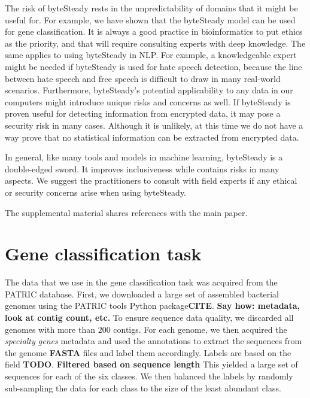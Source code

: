 \documentclass{article}
\begin{document}
The risk of byteSteady rests in the unpredictability of domains that it might be useful for. For example, we have shown that the byteSteady model can be used for gene classification. It is always a good practice in bioinformatics to put ethics as the priority, and that will require consulting experts with deep knowledge. The same applies to using byteSteady in NLP. For example, a knowledgeable expert might be needed if byteSteady is used for hate speech detection, because the line between hate speech and free speech is difficult to draw in many real-world scenarios. Furthermore, byteSteady's potential applicability to any data in our computers might introduce unique risks and concerns as well. If byteSteady is proven useful for detecting information from encrypted data, it may pose a security risk in many cases. Although it is unlikely, at this time we do not have a way prove that no statistical information can be extracted from encrypted data.

In general, like many tools and models in machine learning, byteSteady is a double-edged sword. It improves inclusiveness while contains risks in many aspects. We suggest the practitioners to consult with field experts if any ethical or security concerns arise when using byteSteady.






\vfill
\pagebreak
\appendix

The supplemental material shares references with the main paper.

\section{Gene classification task}

The data that we use in the gene classification task was acquired from the PATRIC database.
First, we downloaded a large set of assembled bacterial genomes using the PATRIC tools Python package\textbf{CITE}.
\textbf{Say how: metadata, look at contig count, etc.}
To ensure sequence data quality, we discarded all genomes with more than $200$ contigs.
For each genome, we then acquired the \emph{specialty genes} metadata and used the annotations to extract the sequences from the genome \textbf{FASTA} files and label them accordingly.
Labels are based on the field \textbf{TODO}.
\textbf{Filtered based on sequence length}
This yielded a large set of sequences for each of the six classes.
We then balanced the labels by randomly sub-sampling the data for each class to the size of the least abundant class.
\end{document}

